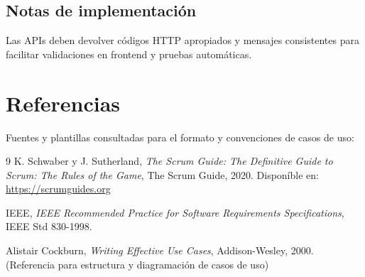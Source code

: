 \documentclass[12pt,a4paper]{article}
\begin{document}
\subsection*{Notas de implementaci\'on}
Las APIs deben devolver c\'odigos HTTP apropiados y mensajes consistentes para facilitar validaciones en frontend y pruebas autom\'aticas.

\newpage
\section{Referencias}
Fuentes y plantillas consultadas para el formato y convenciones de casos de uso:
\begin{thebibliography}{9}
K. Schwaber y J. Sutherland,
\textit{The Scrum Guide: The Definitive Guide to Scrum: The Rules of the Game},
The Scrum Guide, 2020. Dispon\'ible en: \url{https://scrumguides.org}

IEEE,
\textit{IEEE Recommended Practice for Software Requirements Specifications},
IEEE Std 830-1998.

Alistair Cockburn,
\textit{Writing Effective Use Cases}, Addison-Wesley, 2000. (Referencia para estructura y diagramaci\'on de casos de uso)
\end{thebibliography}
\end{document}
